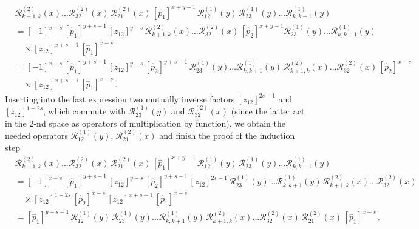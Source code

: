 \documentclass[a4paper,11pt]{article}
\numberwithin{equation}{section}
\begin{document}
\begin{align}
	& \nonumber
	\mathcal{R}^{(2)}_{k+1,k}(x)\dots\mathcal{R}^{(2)}_{32}(x)\,\mathcal{R}^{(2)}_{21}(x)\,[\hat{p}_1]^{x+y-1}\,\mathcal{R}^{(1)}_{12}(y)\,\mathcal{R}^{(1)}_{23}(y)\dots
	\mathcal{R}^{(1)}_{k,k+1}(y) \\
	& \nonumber
	= [-1]^{x-s}\,[\hat{p}_1]^{y+s-1}\,[z_{12}]^{y-s} \,
	\mathcal{R}^{(2)}_{k+1,k}(x)\dots\mathcal{R}^{(2)}_{32}(x) \,
	[\hat{p}_2]^{x+y-1}
	\mathcal{R}^{(1)}_{23}(y)\dots\mathcal{R}^{(1)}_{k,k+1}(y) \\
	& \nonumber
	\quad \times
	[z_{12}]^{x+s-1}\,[\hat{p}_1]^{x-s} \\
	& \nonumber
	= [-1]^{x-s}\,[\hat{p}_1]^{y+s-1}\,[z_{12}]^{y-s} \,
	[\hat{p}_2]^{y+s-1}\,\mathcal{R}^{(1)}_{23}(y)\dots\mathcal{R}^{(1)}_{k,k+1}(y)\,\mathcal{R}^{(2)}_{k+1,k}(x)\dots\mathcal{R}^{(2)}_{32}(x)\,[\hat{p}_2]^{x-s} \\
	& \nonumber
	\quad \times
	[z_{12}]^{x+s-1}\,[\hat{p}_1]^{x-s} \,.
\end{align}
Inserting into the last expression two mutually inverse factors $[z_{12}]^{2s-1}$ and $[z_{12}]^{1-2s}$, which commute with $\mathcal{R}^{(1)}_{23}(y)$ and $\mathcal{R}^{(2)}_{32}(x)$ (since the latter act in the $2$-nd space as operators of multiplication by function),
we obtain the needed operators $\mathcal{R}^{(1)}_{12}(y)$, $\mathcal{R}^{(2)}_{21}(x)$ and finish the proof of the induction step
\begin{align}
	& \nonumber
	\mathcal{R}^{(2)}_{k+1,k}(x)\dots\mathcal{R}^{(2)}_{32}(x)\,\mathcal{R}^{(2)}_{21}(x)\,[\hat{p}_1]^{x+y-1}\,\mathcal{R}^{(1)}_{12}(y)\,\mathcal{R}^{(1)}_{23}(y)\dots
	\mathcal{R}^{(1)}_{k,k+1}(y) \\
	& \nonumber
	= [-1]^{x-s}\,[\hat{p}_1]^{y+s-1}\,[z_{12}]^{y-s} \,
	[\hat{p}_2]^{y+s-1}\,[z_{12}]^{2s-1}\,\mathcal{R}^{(1)}_{23}(y)\dots\mathcal{R}^{(1)}_{k,k+1}(y)\,\mathcal{R}^{(2)}_{k+1,k}(x)\dots\mathcal{R}^{(2)}_{32}(x) \\
	& \nonumber
	\quad \times
	[z_{12}]^{1-2s}\,[\hat{p}_2]^{x-s}\,[z_{12}]^{x+s-1}\,[\hat{p}_1]^{x-s} \\
	& \nonumber
	= [\hat{p}_1]^{y+s-1}\,\mathcal{R}^{(1)}_{12}(y)\,\mathcal{R}^{(1)}_{23}(y)\dots \mathcal{R}^{(1)}_{k,k+1}(y) \,
	\mathcal{R}^{(2)}_{k+1,k}(x)\dots\mathcal{R}^{(2)}_{32}(x)\,\mathcal{R}^{(2)}_{21}(x) \, [\hat{p}_1]^{x-s} \,.
\end{align}
\end{document}
